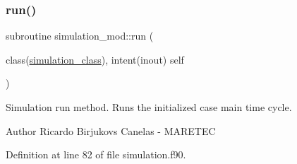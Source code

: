 \subsubsection{\texorpdfstring{run()}{run()}}
{\footnotesize\ttfamily subroutine simulation\+\_\+mod\+::run (\begin{DoxyParamCaption}\item[{class(\mbox{\hyperlink{structsimulation__mod_1_1simulation__class}{simulation\+\_\+class}}), intent(inout)}]{self }\end{DoxyParamCaption})\hspace{0.3cm}{\ttfamily [private]}}



Simulation run method. Runs the initialized case main time cycle. 

\begin{DoxyAuthor}{Author}
Ricardo Birjukovs Canelas -\/ M\+A\+R\+E\+T\+EC 
\end{DoxyAuthor}


Definition at line 82 of file simulation.\+f90.


